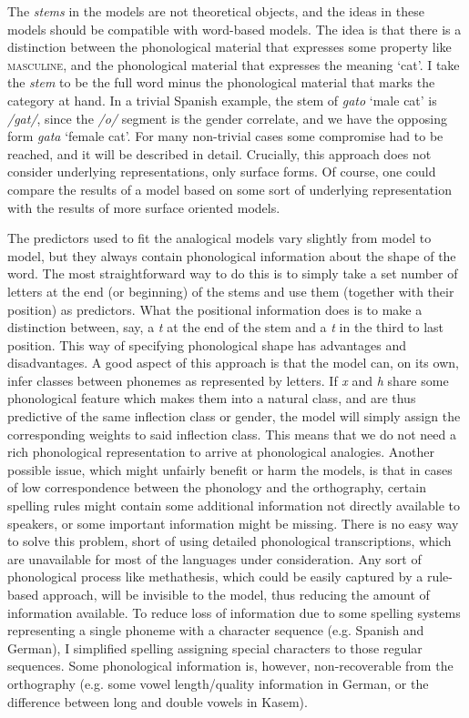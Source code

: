 The \textit{stems} in the models are not theoretical objects, and the ideas in these models should be compatible with word-based models. The idea is that there is a distinction between the phonological material that expresses some property like \textsc{masculine}, and the phonological material that expresses the meaning `cat'. I take the \textit{stem} to be the full word minus the phonological material that marks the category at hand. In a trivial Spanish example, the stem of \textit{gato} `male cat' is \textit{/gat/}, since the \textit{/o/} segment is the gender correlate, and we have the opposing form \textit{gata} `female cat'. For many non-trivial cases some compromise had to be reached, and it will be described in detail. Crucially, this approach does not consider underlying representations, only surface forms. Of course, one could compare the results of a model based on some sort of underlying representation with the results of more surface oriented models.

The predictors used to fit the analogical models vary slightly from model to model, but they always contain phonological information about the shape of the word. The most straightforward way to do this is to simply take a set number of letters at the end (or beginning) of the stems and use them (together with their position) as predictors. What the positional information does is to make a distinction between, say, a \textit{t} at the end of the stem and a \textit{t} in the third to last position. This way of specifying phonological shape has advantages and disadvantages. A good aspect of this approach is that the model can, on its own, infer classes between phonemes as represented by letters. If \textit{x} and \textit{h} share some phonological feature which makes them into a natural class, and are thus predictive of the same inflection class or gender, the model will simply assign the corresponding weights to said inflection class. This means that we do not need a rich phonological representation to arrive at phonological analogies. Another possible issue, which might unfairly benefit or harm the models, is that in cases of low correspondence between the phonology and the orthography, certain spelling rules might contain some additional information not directly available to speakers, or some important information might be missing. There is no easy way to solve this problem, short of using detailed phonological transcriptions, which are unavailable for most of the languages under consideration. Any sort of phonological process like methathesis, which could be easily captured by a rule-based approach, will be invisible to the model, thus reducing the amount of information available. To reduce loss of information due to some spelling systems representing a single phoneme with a character sequence (e.g. Spanish and German), I simplified spelling assigning special characters to those regular sequences. Some phonological information is, however, non-recoverable from the orthography (e.g. some vowel length/quality information in German, or the difference between long and double vowels in Kasem).

